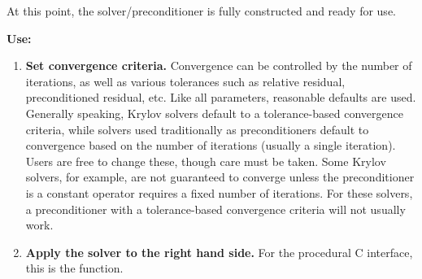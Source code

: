 At this point, the solver/preconditioner is fully constructed and ready for use. 

{\bf Use:}

\begin{enumerate}

\item
{\bf Set convergence criteria.} Convergence can be controlled by the number of iterations,
as well as various tolerances such as relative residual, preconditioned residual, etc.
Like all parameters, reasonable defaults are used. Generally speaking, Krylov solvers
default to a tolerance-based convergence criteria, while solvers used traditionally as
preconditioners default to convergence based on the number of iterations (usually a single
iteration). Users are free to change these, though care must be taken. Some Krylov solvers,
for example, are not guaranteed to converge unless the preconditioner is a constant operator
requires a fixed number of iterations. For these solvers, a preconditioner
with a tolerance-based convergence criteria will not usually work.

\item
{\bf Apply the solver to the right hand side.} For the procedural C interface, this is the 
 function. 

\end{enumerate}
